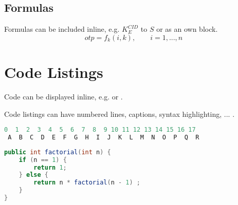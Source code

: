\subsection{Formulas}

Formulas can be included inline, e.g. $K_E^{CID}$ to $S$ or as an own block.
$$ otp = f_k(i, k), \qquad i = 1, ..., n $$

\pagebreak
\section{Code Listings}\label{sec:code}

Code can be displayed inline, e.g.  or .

Code listings can have numbered lines, captions, syntax highlighting, ... .

\begin{lstlisting}[caption={[Code Without Line Numbers] Code Without Line Numbers \\ \captionsource{\cite{mus:16}}}, label={lst:codeExample}, language=python, numbers=none]
 0  1  2  3  4  5  6  7  8  9 10 11 12 13 14 15 16 17 
 A  B  C  D  E  F  G  H  I  J  K  L  M  N  O  P  Q  R  
\end{lstlisting}

\begin{lstlisting}[caption={Code With Line Numbers}, label={lst:factorial}, language=Java]
public int factorial(int n) {
	if (n == 1) {
		return 1;
	} else {
		return n * factorial(n - 1) ;
	}
}
\end{lstlisting}
